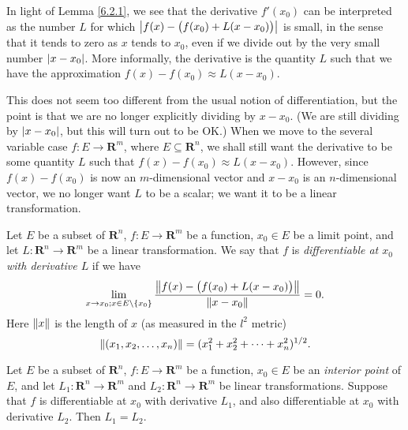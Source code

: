 \begin{note}
    In light of Lemma \ref{6.2.1}, we see that the derivative \(f'(x_0)\) can be interpreted as the number \(L\) for which \(\abs*{f(x) - \big(f(x_0) + L(x - x_0)\big)}\) is small, in the sense that it tends to zero as \(x\) tends to \(x_0\), even if we divide out by the very small number \(\abs*{x - x_0}\).
    More informally, the derivative is the quantity \(L\) such that we have the approximation \(f(x) - f(x_0) \approx L(x - x_0)\).

    This does not seem too different from the usual notion of differentiation, but the point is that we are no longer explicitly dividing by \(x - x_0\).
    (We are still dividing by \(\abs*{x - x_0}\), but this will turn out to be OK.)
    When we move to the several variable case \(f : E \to \mathbf{R}^m\), where \(E \subseteq \mathbf{R}^n\), we shall still want the derivative to be some quantity \(L\) such that \(f(x) - f(x_0) \approx L(x - x_0)\).
    However, since \(f(x) - f(x_0)\) is now an \(m\)-dimensional vector and \(x - x_0\) is an \(n\)-dimensional vector, we no longer want \(L\) to be a scalar;
    we want it to be a linear transformation.
\end{note}

\begin{definition}[Differentiability]\label{6.2.2}
    Let \(E\) be a subset of \(\mathbf{R}^n\), \(f : E \to \mathbf{R}^m\) be a function, \(x_0 \in E\) be a limit point, and let \(L : \mathbf{R}^n \to \mathbf{R}^m\) be a linear transformation.
    We say that \(f\) is \emph{differentiable at \(x_0\) with derivative \(L\)} if we have
    \[
        \lim_{x \to x_0 ; x \in E \setminus \{x_0\}} \frac{\norm*{f(x) - \big(f(x_0) + L(x - x_0)\big)}}{\norm*{x - x_0}} = 0.
    \]
    Here \(\norm*{x}\) is the length of \(x\) (as measured in the \(l^2\) metric)
    \[
        \norm*{(x_1, x_2, \dots, x_n)} = (x_1^2 + x_2^2 + \dots + x_n^2)^{1 / 2}.
    \]
\end{definition}

\setcounter{theorem}{3}
\begin{lemma}\label{6.2.4}
    Let \(E\) be a subset of \(\mathbf{R}^n\), \(f : E \to \mathbf{R}^m\) be a function, \(x_0 \in E\) be an \emph{interior point} of \(E\), and let \(L_1 : \mathbf{R}^n \to \mathbf{R}^m\) and \(L_2 : \mathbf{R}^n \to \mathbf{R}^m\) be linear transformations.
    Suppose that \(f\) is differentiable at \(x_0\) with derivative \(L_1\), and also differentiable at \(x_0\) with derivative \(L_2\).
    Then \(L_1 = L_2\).
\end{lemma}

